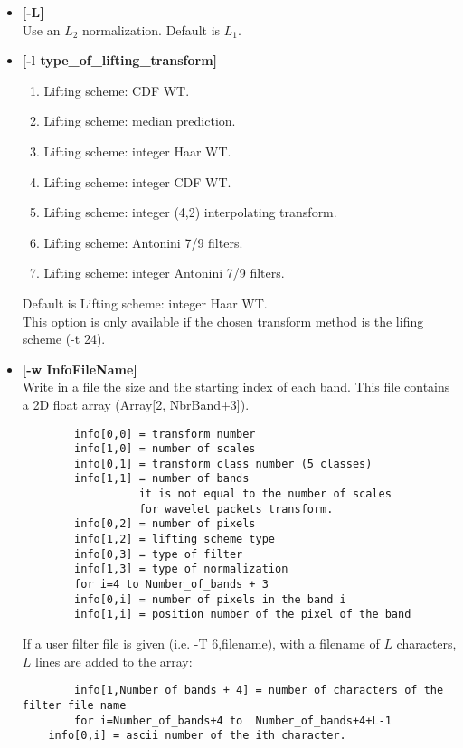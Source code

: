 \begin{itemize}
{\begin{enumerate}
\end{enumerate}}
Default is Antonini 7/9 filters. \\
 This option is only available if the chosen transform method is
 the (bi-) orthogonal transform (-t option in [7,15,17]).
\item {\bf [-L]} \\
Use an $L_2$ normalization. Default is $L_1$.
\item {\bf [-l type\_of\_lifting\_transform]}  
{\small 
\begin{enumerate}
\baselineskip=0.4truecm
\itemsep=0.1truecm
\item Lifting scheme: CDF WT. 
\item Lifting scheme: median prediction.
\item Lifting scheme: integer Haar WT. 
\item Lifting scheme: integer CDF WT. 
\item Lifting scheme: integer (4,2) interpolating transform. 
\item Lifting scheme:  Antonini 7/9 filters.
\item Lifting scheme: integer Antonini 7/9 filters. 
\end{enumerate}}
 Default is Lifting scheme: integer Haar WT. \\
 This option is only available if the chosen transform method is
 the lifing scheme (-t 24).
\item {\bf [-w InfoFileName]} \\
Write in a file the size and the starting index of each band.
This file contains a 2D float array (Array[2, NbrBand+3]).
\begin{verbatim}
        info[0,0] = transform number
        info[1,0] = number of scales
        info[0,1] = transform class number (5 classes)
        info[1,1] = number of bands
                  it is not equal to the number of scales
                  for wavelet packets transform.
        info[0,2] = number of pixels
        info[1,2] = lifting scheme type
        info[0,3] = type of filter
        info[1,3] = type of normalization
        for i=4 to Number_of_bands + 3
        info[0,i] = number of pixels in the band i
        info[1,i] = position number of the pixel of the band
\end{verbatim}
If a user filter file is given (i.e. -T 6,filename), with a filename 
of $L$ characters, $L$ lines are added to the array:
\begin{verbatim}
        info[1,Number_of_bands + 4] = number of characters of the filter file name
        for i=Number_of_bands+4 to  Number_of_bands+4+L-1
	info[0,i] = ascii number of the ith character.
\end{verbatim}

\end{itemize}
